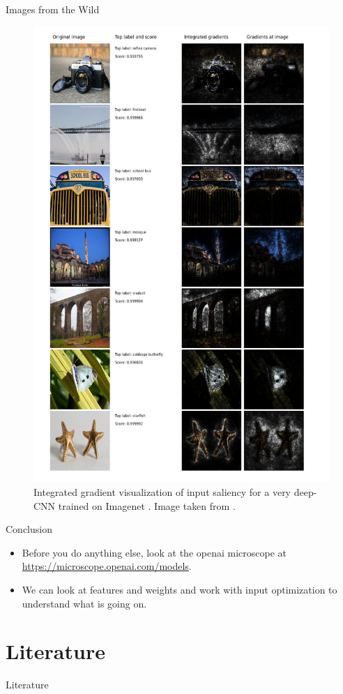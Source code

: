 \documentclass{beamer}
\begin{document}
    \begin{frame}{Images from the Wild}
      \begin{figure}
      \includegraphics[scale=.16]{./figures/ig_paper.png}
      \caption{Integrated gradient visualization of input saliency for a very deep-CNN trained on Imagenet \cite{deng2009imagenet}.
      Image taken from \cite{sundararajan2017axiomatic}.}
      \end{figure}
    \end{frame}

    \begin{frame}{Conclusion}
      \begin{itemize}
        \item Before you do anything else, look at the openai microscope at \url{https://microscope.openai.com/models}.
        \item We can look at features and weights and work with input optimization to understand what is going on.
      \end{itemize}
    \end{frame}

    \section{Literature}
    \begin{frame}[allowframebreaks]{Literature}
      \printbibliography
    \end{frame}
\end{document}
